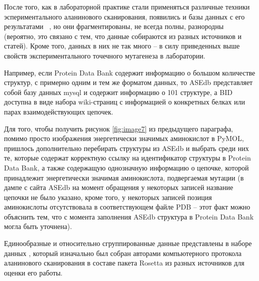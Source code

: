 



После того, как в лабораторной практике стали применяться различные техники эспериментального аланинового сканирования, появились и базы данных с его результатами ~\cite{asedb2001, bid2003}, но они фрагментированы, не всегда полны, разнородны (вероятно, это связано с тем, что данные собираются из разных источников и статей). Кроме того, данных в них не так много -- в силу приведенных выше свойств экспериментального точечного мутагенеза в лаборатории.

Например, если Protein Data Bank содержит информацию о большом количестве структур, с примерно одним и тем же форматом данных, то ASEdb представляет собой базу данных mysql и содержит информацию о 101 структуре, а BID доступна в виде набора wiki-страниц с информацией о конкретных белках или парах взаимодействующих цепочек.

Для того, чтобы получить рисунок \ref{fig:image7} из предыдущего параграфа, помимо просто изображения энергетически значимых аминокислот в PyMOL, пришлось дополнительно перебирать структуры из ASEdb и выбрать среди них те, которые содержат корректную ссылку на идентификатор структуры в Protein Data Bank, а также содержащую однозначную информацию о цепочке, которой принадлежит энергетически значимая аминокислота, подвергаемая мутации (в дампе с сайта ASEdb на момент обращения у некоторых записей название цепочки не было указано, кроме того, у некоторых записей позиция аминокислоты отсутствовала в соответствующем файле PDB -- этот факт можно объяснить тем, что с момента заполнения ASEdb структура в Protein Data Bank могла быть уточнена).

Единообразные и относительно сгруппированные данные представлены в наборе данных  \cite{kortemme_alascan_datasets}, который изначально был собран авторами компьютерного протокола аланинового сканирования в составе пакета Rosetta \cite{kortemme2002, kortemme2004} из разных источников для оценки его работы.

